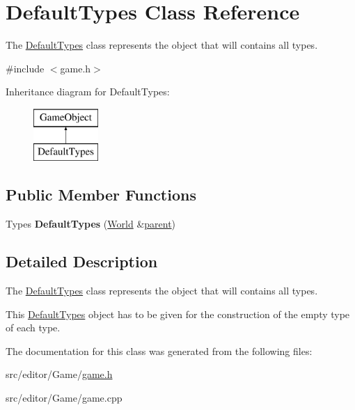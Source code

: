 \hypertarget{class_default_types}{\section{\-Default\-Types \-Class \-Reference}
\label{class_default_types}
}


\-The \hyperlink{class_default_types}{\-Default\-Types} class represents the object that will contains all types.  




{\ttfamily \#include $<$game.\-h$>$}

\-Inheritance diagram for \-Default\-Types\-:\begin{figure}[H]
\begin{center}
\leavevmode
\includegraphics[height=2.000000cm]{class_default_types}
\end{center}
\end{figure}
\subsection*{\-Public \-Member \-Functions}
\begin{DoxyCompactItemize}
\item 
\hypertarget{class_default_types_ae429a10f1aa1c005f0e53dad919b4e44}{\-Types {\bfseries \-Default\-Types} (\hyperlink{class_world}{\-World} \&\hyperlink{class_game_object_af3deaf39cde23c189765634e32e95bb4}{parent})}\label{class_default_types_ae429a10f1aa1c005f0e53dad919b4e44}

\end{DoxyCompactItemize}


\subsection{\-Detailed \-Description}
\-The \hyperlink{class_default_types}{\-Default\-Types} class represents the object that will contains all types. 

\-This \hyperlink{class_default_types}{\-Default\-Types} object has to be given for the construction of the empty type of each type. 

\-The documentation for this class was generated from the following files\-:\begin{DoxyCompactItemize}
\item 
src/editor/\-Game/\hyperlink{game_8h}{game.\-h}\item 
src/editor/\-Game/game.\-cpp\end{DoxyCompactItemize}
